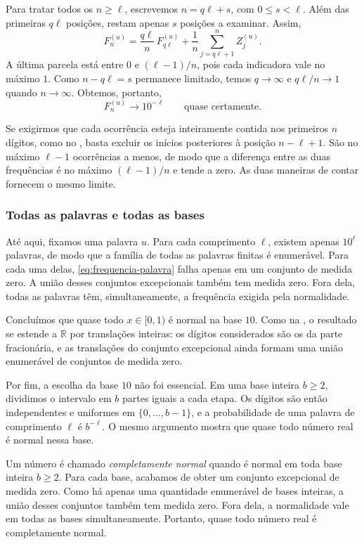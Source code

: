 \documentclass[12pt,portuguese]{article}
\theoremstyle{definition}
\theoremstyle{plainexercise}
\theoremstyle{starredexercise}
\theoremstyle{definition}
\begin{document}
Para tratar todos os $n\geqslant\ell$, escrevemos
$n=q\ell+s$, com $0\leqslant s<\ell$. Além das primeiras $q\ell$ posições,
restam apenas $s$ posições a examinar. Assim,
\[
F_n^{(u)}
=\frac{q\ell}{n}\,F_{q\ell}^{(u)}
+\frac{1}{n}\sum_{j=q\ell+1}^{n}Z_j^{(u)}.
\]
A última parcela está entre $0$ e $(\ell-1)/n$, pois cada indicadora vale
no máximo $1$. Como $n-q\ell=s$ permanece limitado, temos $q\to\infty$ e
$q\ell/n\to1$ quando $n\to\infty$. Obtemos, portanto,
\begin{equation}\label{eq:frequencia-palavra}
F_n^{(u)}\longrightarrow10^{-\ell}
\qquad\text{quase certamente.}
\end{equation}

Se exigirmos que cada ocorrência esteja inteiramente contida nos primeiros
$n$ dígitos, como no , basta excluir os inícios
posteriores à posição $n-\ell+1$. São no máximo $\ell-1$ ocorrências a
menos, de modo que a diferença entre as duas frequências é no máximo
$(\ell-1)/n$ e tende a zero. As duas maneiras de contar fornecem o mesmo
limite.

\subsubsection{Todas as palavras e todas as bases}

Até aqui, fixamos uma palavra $u$. Para cada comprimento $\ell$, existem
apenas $10^\ell$ palavras, de modo que a família de todas as palavras
finitas é enumerável. Para cada uma delas, \eqref{eq:frequencia-palavra}
falha apenas em um conjunto de medida zero. A união desses conjuntos
excepcionais também tem medida zero. Fora dela, todas as palavras têm,
simultaneamente, a frequência exigida pela normalidade.

Concluímos que quase todo $x\in[0,1)$ é normal na base $10$. Como na
, o resultado se estende a $\mathbb{R}$ por
translações inteiras: os dígitos considerados são os da parte fracionária,
e as translações do conjunto excepcional ainda formam uma união
enumerável de conjuntos de medida zero.

Por fim, a escolha da base $10$ não foi essencial. Em uma base inteira
$b\geqslant2$, dividimos o intervalo em $b$ partes iguais a cada etapa.
Os dígitos são então independentes e uniformes em $\{0,\ldots,b-1\}$, e
a probabilidade de uma palavra de comprimento $\ell$ é $b^{-\ell}$.
O mesmo argumento mostra que quase todo número real é normal nessa base.

Um número é chamado \emph{completamente normal} quando é normal em toda
base inteira $b\geqslant2$. Para cada base, acabamos de obter um conjunto
excepcional de medida zero. Como há apenas uma quantidade enumerável de
bases inteiras, a união desses conjuntos também tem medida zero.
Fora dela, a normalidade vale em todas as bases simultaneamente. Portanto,
quase todo número real é completamente normal.
\end{document}
